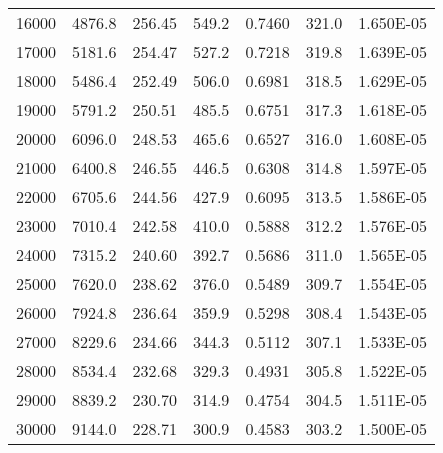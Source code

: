 \begin{table}[ht!]
\begin{tabular}{rrrrrrr}
        	16000	&	4876.8	&	256.45	&	549.2	&	0.7460	&	321.0	&	1.650E-05	\\
        	17000	&	5181.6	&	254.47	&	527.2	&	0.7218	&	319.8	&	1.639E-05	\\
        	18000	&	5486.4	&	252.49	&	506.0	&	0.6981	&	318.5	&	1.629E-05	\\
        	19000	&	5791.2	&	250.51	&	485.5	&	0.6751	&	317.3	&	1.618E-05	\\
        	20000	&	6096.0	&	248.53	&	465.6	&	0.6527	&	316.0	&	1.608E-05	\\
        	21000	&	6400.8	&	246.55	&	446.5	&	0.6308	&	314.8	&	1.597E-05	\\
        	22000	&	6705.6	&	244.56	&	427.9	&	0.6095	&	313.5	&	1.586E-05	\\
        	23000	&	7010.4	&	242.58	&	410.0	&	0.5888	&	312.2	&	1.576E-05	\\
        	24000	&	7315.2	&	240.60	&	392.7	&	0.5686	&	311.0	&	1.565E-05	\\
        	25000	&	7620.0	&	238.62	&	376.0	&	0.5489	&	309.7	&	1.554E-05	\\
        	26000	&	7924.8	&	236.64	&	359.9	&	0.5298	&	308.4	&	1.543E-05	\\
        	27000	&	8229.6	&	234.66	&	344.3	&	0.5112	&	307.1	&	1.533E-05	\\
        	28000	&	8534.4	&	232.68	&	329.3	&	0.4931	&	305.8	&	1.522E-05	\\
        	29000	&	8839.2	&	230.70	&	314.9	&	0.4754	&	304.5	&	1.511E-05	\\
        	30000	&	9144.0	&	228.71	&	300.9	&	0.4583	&	303.2	&	1.500E-05	\\

\end{tabular}
\end{table}
